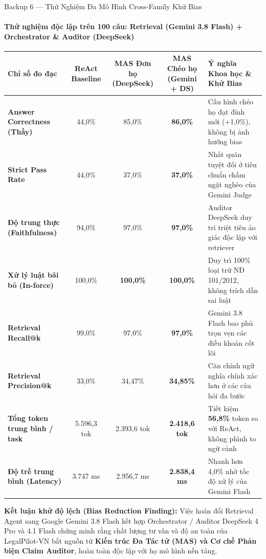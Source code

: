 \documentclass[aspectratio=169,10pt,xcolor={table}]{beamer}
\begin{document}
\begin{frame}{Backup 6 --- Thử Nghiệm Đa Mô Hình Cross-Family Khử Bias}
\framesubtitle{Thử nghiệm độc lập trên 100 câu: Retrieval (Gemini 3.8 Flash) + Orchestrator \& Auditor (DeepSeek)}
\centering
\scriptsize
\begin{tabularx}{0.98\linewidth}{@{}p{3.8cm} c c c X@{}}
\toprule
\textbf{Chỉ số đo đạc} & \textbf{ReAct Baseline} & \textbf{MAS Đơn họ (DeepSeek)} & \textbf{MAS Chéo họ (Gemini + DS)} & \textbf{Ý nghĩa Khoa học \& Khử Bias} \\ \midrule
\textbf{Answer Correctness (Thầy)} & 44,0\% & 85,0\% & \textbf{86,0\%} & Cấu hình chéo họ đạt đỉnh mới (+1,0\%), không bị ảnh hưởng bias \\
\textbf{Strict Pass Rate} & 44,0\% & 37,0\% & \textbf{37,0\%} & Nhất quán tuyệt đối ở tiêu chuẩn chấm ngặt nghèo của Gemini Judge \\
\textbf{Độ trung thực (Faithfulness)} & 94,0\% & 97,0\% & \textbf{97,0\%} & Auditor DeepSeek duy trì triệt tiêu ảo giác độc lập với retriever \\
\textbf{Xử lý luật bãi bỏ (In-force)} & 100,0\% & \textbf{100,0\%} & \textbf{100,0\%} & Duy trì 100\% loại trừ NĐ 101/2012, không trích dẫn sai luật \\
\textbf{Retrieval Recall@k} & 99,0\% & 97,0\% & \textbf{97,0\%} & Gemini 3.8 Flash bao phủ trọn vẹn các điều khoản cốt lõi \\
\textbf{Retrieval Precision@k} & 33,0\% & 34,47\% & \textbf{34,85\%} & Căn chỉnh ngữ nghĩa chính xác hơn ở các câu hỏi đa bước \\
\textbf{Tổng token trung bình / task}& 5.596,3 tok & 2.393,6 tok & \textbf{2.418,6 tok} & Tiết kiệm \textbf{56,8\%} token so với ReAct, không phình to ngữ cảnh \\
\textbf{Độ trễ trung bình (Latency)} & 3.747 ms & 2.956,7 ms & \textbf{2.838,4 ms} & Nhanh hơn 4,0\% nhờ tốc độ xử lý của Gemini Flash \\
\bottomrule
\end{tabularx}
\vskip0.12cm
\begin{tcolorbox}[colback=hcmutblue!10,colframe=hcmutblue,boxrule=0.5pt,top=2pt,bottom=2pt,left=4pt,right=4pt]
\scriptsize\textbf{Kết luận khử độ lệch (Bias Reduction Finding):} Việc hoán đổi Retrieval Agent sang Google Gemini 3.8 Flash kết hợp Orchestrator / Auditor DeepSeek 4 Pro và 4.1 Flash chứng minh rằng chất lượng tư vấn và độ an toàn của LegalPilot-VN bắt nguồn từ \textbf{Kiến trúc Đa Tác tử (MAS) và Cơ chế Phản biện Claim Auditor}, hoàn toàn độc lập với họ mô hình nền tảng.
\end{tcolorbox}
\end{frame}
\end{document}

